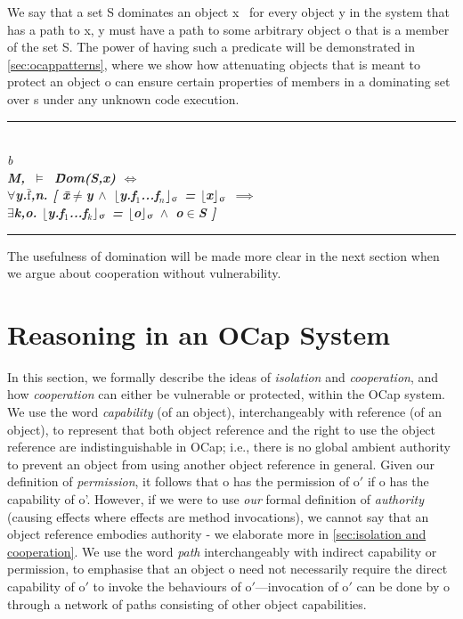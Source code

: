 \documentclass[a4paper,11pt,twoside]{article}
\makeatletter
\newenvironment{logic}
{\begin{minipage}[c]{\linewidth}  \sffamily \mdseries \begin{tabbing}}
{\end{tabbing}\end{minipage}\vspace{0.3em}}
\newcommand{\loin}{$\in$}
\newcommand{\loforall}{$\forall$}
\newcommand{\loexists}{$\exists$}
\newcommand{\loand}{$\land$}
\newcommand{\loneq} {$\neq$}
\newcommand{\loimplies}{$\implies$}
\newcommand{\losigma}{\text{$\upsigma$}}
\newcommand{\loturns} {$\vDash$}
\newcommand{\loiff} {$\iff$}
\newcommand{\loexec}[2] {$\lfloor$#1$\rfloor _{\text{#2}}$}
\newcommand{\loconj}[1] {$\bar{\text{#1}}$}
\newcommand{\lotiff} {\textit{\textls[-20]{iff}}}
\newcommand{\hr}{\rule{\linewidth}{0.4pt}}
\DeclareRobustCommand{\emp}{%
  \@nomath\em \if b\expandafter\@car\f@series\@nil
  \normalfont \else \sffamily \bfseries \fi}
\makeatother
\begin{document}
We say that a set S dominates an object x \lotiff\ for every object y in the system that has a path to x, y must have a path to some arbitrary object o that is a member of the set S. The power of having such a predicate will be demonstrated in \cref{sec:ocappatterns}, where we show how attenuating objects that is meant to protect an object o can ensure certain properties of members in a dominating set over s under any unknown code execution.\\

\begin{logic}
\hr\\
\emp{Definition---[Domination]}\\
M,\losigma\ \loturns\ \=Dom(S,x) \loiff \\
\> \loforall y.\loconj{f},n. [ \= x\loneq y \loand\ \loexec{y.f$_1$...f$_n$}{\losigma} = \loexec{x}{\losigma} \loimplies\\
\>\> \loexists k,o. \loexec{y.f$_1$...f$_k$}{\losigma} = \loexec{o}{\losigma} \loand\ o\loin S ]\\
\hr
\end{logic}
The usefulness of domination will be made more clear in the next section when we argue about cooperation without vulnerability.
\section{Reasoning in an OCap System}\label{sec:ocapspecs}

In this section, we formally describe the ideas of \textit{isolation} and \textit{cooperation}, and how \textit{cooperation} can either be vulnerable or protected, within the OCap system. We use the word \textit{capability} (of an object), interchangeably with reference (of an object), to represent that both object reference and the right to use the object reference are indistinguishable in OCap; i.e., there is no global ambient authority to prevent an object from using another object reference in general. Given our definition of \textit{permission}, it follows that o has the permission of o$'$ if o has the capability of o'. However, if we were to use \textit{our} formal definition of \textit{authority} (causing effects where effects are method invocations), we cannot say that an object reference embodies authority - we elaborate more in \cref{sec:isolation and cooperation}. We use the word \textit{path} interchangeably with indirect capability or permission, to emphasise that an object o need not necessarily require the direct capability of o$'$ to invoke the behaviours of o$'$---invocation of o$'$ can be done by o through a network of paths consisting of other object capabilities.\\
\end{document}
